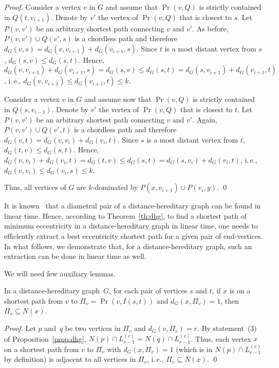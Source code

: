 \documentclass[10pt]{llncs}
\makeatletter
\newcommand{\ie}{i.\,e.\@ifnextchar{,}{}{~}}
\makeatother
\begin{document}
\begin{proof}
Consider a vertex $v$ in $G$ and assume that $\Pr(v,Q)$ is strictly contained in $Q(t,v_{i+1})$. 
Denote by $v'$ the vertex of $\Pr(v,Q)$ that is closest to $s$. 
Let $P(v,v')$ be an arbitrary shortest path connecting $v$ and $v'$. 
As before, $P(v,v') \cup Q(v',s)$ is a chordless path and therefore $d_G(v,s) = d_G(v,v_{i+1}) + d_G(v_{i+1},s)$.
Since $t$ is a most distant vertex from $s$, $d_G(s,v) \leq d_G(s,t)$. 
Hence, $d_G(v,v_{i+1}) + d_G(v_{i+1},s) = d_G(s,v) \leq d_G(s,t) = d_G(s,v_{i+1}) + d_G(v_{i+1},t)$, \ie, $d_G(v,v_{i+1}) \leq d_G(v_{i+1},t) \leq k$. 

Consider a vertex $v$ in $G$ and assume now that $\Pr(v,Q)$ is strictly contained in $Q(s,v_{i-1})$. 
Denote by $v'$ the vertex of $\Pr(v,Q)$ that is closest to $t$. 
Let $P(v,v')$ be an arbitrary shortest path connecting $v$ and $v'$. 
Again, $P(v,v') \cup Q(v',t)$ is a chordless path and therefore $d_G(v,t) = d_G(v,v_{i}) + d_G(v_{i},t)$.
Since $s$ is a most distant vertex from $t$, $d_G(t,v) \leq d_G(s,t)$. 
Hence, $d_G(v,v_{i}) + d_G(v_{i},t) = d_G(t,v) \leq d_G(s,t) = d_G(s,v_{i}) + d_G(v_{i},t)$, \ie, $d_G(v,v_{i}) \leq d_G(v_{i},s) \leq k$. 

Thus, all vertices of $G$ are $k$-dominated by $P(x,v_{i+1}) \cup P(v_{i},y)$. 
\qed
\end{proof}

It is known~\cite{DrNi} that a diametral pair of a distance-hereditary graph can be found in linear time. 
Hence, according to Theorem~\ref{th:dhg}, to find a shortest path of minimum eccentricity in a distance-hereditary graph in linear time, one needs to efficiently extract a best eccentricity shortest path for a given pair of end-vertices. 
In what follows, we demonstrate that, for a distance-hereditary graph, such an extraction can be done in linear time as well. 

We will need few auxiliary lemmas. 

\begin{lemma}
    \label{lem:dhgGateVertex}
In a distance-hereditary graph~$G$, for each pair of vertices $s$ and $t$, if $x$ is on a shortest path from $v$ to $\Pi_v = \Pr(v, I(s,t))$ and $d_G(x,\Pi_v) = 1$, then $\Pi_v \subseteq N(x)$.
\end{lemma}

\begin{proof}
Let $p$ and~$q$ be two vertices in $\Pi_v$ and $d_G(v, \Pi_v) = r$.
By statement~(3) of Proposition~\ref{prop:dhg}, $N(p) \cap L_{r-1}^{(v)} = N(q) \cap L_{r-1}^{(v)}$. 
Thus, each vertex $x$ on a shortest path from $v$ to $\Pi_v$ with $d_G(x,\Pi_v) = 1$ (which is in $N(p) \cap L_{r-1}^{(v)}$ by definition) is adjacent to all vertices in $\Pi_v$, \ie, $\Pi_v \subseteq N(x)$.
\qed
\end{proof}
\end{document}
